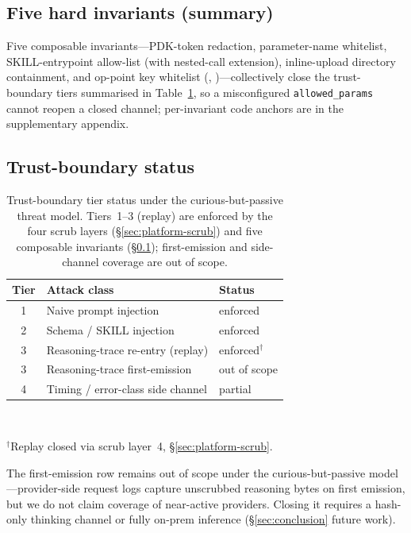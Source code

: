 \subsection{Five hard invariants (summary)}
\label{sec:platform-invariants}

Five composable invariants---PDK-token redaction, parameter-name
whitelist, SKILL-entrypoint allow-list (with nested-call
extension), inline-upload directory containment, and op-point key
whitelist (,
)---collectively close the
trust-boundary tiers summarised in Table~\ref{tab:tiers}, so a
misconfigured \texttt{allowed\_params} cannot reopen a closed
channel; per-invariant code anchors are in the supplementary
appendix.

\subsection{Trust-boundary status}
\label{sec:platform-status}

\begin{table}[t]
  \centering
  \caption{Trust-boundary tier status under the
    curious-but-passive threat model. Tiers~1--3 (replay) are
    enforced by the four scrub layers
    (\S\ref{sec:platform-scrub}) and five composable invariants
    (\S\ref{sec:platform-invariants}); first-emission and
    side-channel coverage are out of scope.}
  \label{tab:tiers}
  \footnotesize
  \begin{tabular}{c l l}
    \toprule
    \textbf{Tier} & \textbf{Attack class} & \textbf{Status} \\
    \midrule
    1 & Naive prompt injection            & enforced \\
    2 & Schema / SKILL injection          & enforced \\
    3 & Reasoning-trace re-entry (replay) & enforced$^{\dagger}$ \\
    3 & Reasoning-trace first-emission    & out of scope \\
    4 & Timing / error-class side channel & partial \\
    \bottomrule
  \end{tabular}
  \\[0.3em]
  \begin{minipage}{0.95\linewidth}\footnotesize
  $^{\dagger}$Replay closed via scrub layer~4,
  \S\ref{sec:platform-scrub}.
  \end{minipage}
\end{table}

The first-emission row remains out of scope under the
curious-but-passive model---provider-side request logs capture
unscrubbed reasoning bytes on first emission, but we do not claim
coverage of near-active providers. Closing it requires a hash-only
thinking channel or fully on-prem inference
(\S\ref{sec:conclusion} future work).
